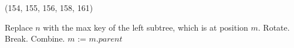 \begin{theorem}{(154, 155, 156, 158, 161)}
\begin{itemize}
\begin{algorithm}[H]
\begin{algorithmic}[1]
                        \State Replace $n$ with the max key of the left subtree, which is at position $m$.
                         
                                \State Rotate.
                                \State Break.
                            \Else
                                \State Combine.
                                \State $m$ := $m.parent$
                            \EndIf
                        \EndWhile
                    \EndIf
                \EndFunction
            \end{algorithmic}
        \end{algorithm}
    \end{itemize}
\end{theorem}

